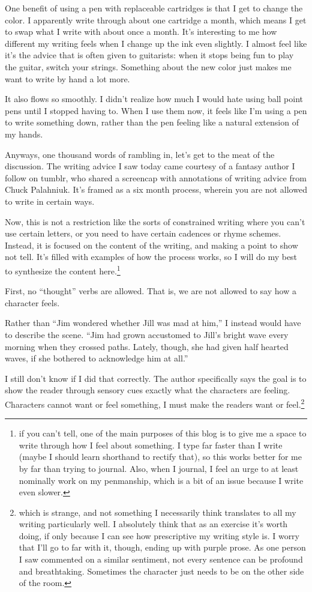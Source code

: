 \documentclass[12pt]{article}[titlepage]
\newcommand{\say}[1]{``#1''}
\newcommand{\1}{\={a}}
\newcommand{\2}{\={e}}
\newcommand{\3}{\={\i}}
\newcommand{\4}{\=o}
\newcommand{\5}{\=u}
\newcommand{\6}{\={A}}
\renewcommand{\,}{\textsuperscript{,}}
\begin{document}
One benefit of using a pen with replaceable cartridges is that I get to change the color.
I apparently write through about one cartridge a month, which means I get to swap what I write with about once a month.
It's interesting to me how different my writing feels when I change up the ink even slightly.
I almost feel like it's the advice that is often given to guitarists: when it stops being fun to play the guitar, switch your strings.
Something about the new color just makes me want to write by hand a lot more.

It also flows so smoothly.
I didn't realize how much I would hate using ball point pens until I stopped having to.
When I use them now, it feels like I'm using a pen to write something down, rather than the pen feeling like a natural extension of my hands.

Anyways, one thousand words of rambling in, let's get to the meat of the discussion.
The writing advice I saw today came courtesy of a fantasy author I follow on tumblr, who shared a screencap with annotations of writing advice from Chuck Palahniuk.
It's framed as a six month process, wherein you are not allowed to write in certain ways.

Now, this is not a restriction like the sorts of constrained writing where you can't use certain letters, or you need to have certain cadences or rhyme schemes.
Instead, it is focused on the content of the writing, and making a point to show not tell.
It's filled with examples of how the process works, so I will do my best to synthesize the content here.\footnote{if you can't tell, one of the main purposes of this blog is to give me a space to write through how I feel about something.
I type far faster than I write (maybe I should learn shorthand to rectify that), so this works better for me by far than trying to journal.
Also, when I journal, I feel an urge to at least nominally work on my penmanship, which is a bit of an issue because I write even slower.}

First, no \say{thought} verbs are allowed.
That is, we are not allowed to say how a character feels.

Rather than \say{Jim wondered whether Jill was mad at him,} I instead would have to describe the scene.
\say{Jim had grown accustomed to Jill's bright wave every morning when they crossed paths.
Lately, though, she had given half hearted waves, if she bothered to acknowledge him at all.}

I still don't know if I did that correctly.
The author specifically says the goal is to show the reader through sensory cues exactly what the characters are feeling.
Characters cannot want or feel something, I must make the readers want or feel.\footnote{which is strange, and not something I necessarily think translates to all my writing particularly well.
I absolutely think that as an exercise it's worth doing, if only because I can see how prescriptive my writing style is.
I worry that I'll go to far with it, though, ending up with purple prose.
As one person I saw commented on a similar sentiment, not every sentence can be profound and breathtaking.
Sometimes the character just needs to be on the other side of the room.}
\end{document}
